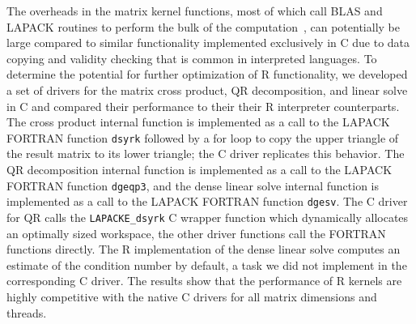 The overheads in the matrix kernel functions, most of which call BLAS and
  LAPACK routines to perform the bulk of the computation~\cite{cran:Rmanuals},
  can potentially be large compared to similar functionality implemented
  exclusively in C due to data copying and validity checking that is common in
  interpreted languages.
To determine the potential for further optimization of R functionality, we
  developed a set of drivers for the matrix cross product, QR decomposition,
  and linear solve in C and compared their performance to their
  their R interpreter counterparts.
The cross product internal function is implemented as a call to the LAPACK
  FORTRAN function \texttt{dsyrk} followed by a for loop to copy the upper
  triangle of the result matrix to its lower triangle; the C driver replicates
  this behavior.
The QR decomposition internal function is implemented as a call to the LAPACK
  FORTRAN function \texttt{dgeqp3}, and the dense linear solve internal function
  is implemented as a call to the LAPACK FORTRAN function \texttt{dgesv}.
The C driver for QR calls the \texttt{LAPACKE\_dsyrk} C wrapper function which
  dynamically allocates an optimally sized workspace, the other driver functions
  call the FORTRAN functions directly.
The R implementation of the dense linear solve computes an estimate of the
  condition number by default, a task we did not implement in the corresponding
  C driver.
The results show that the performance of R kernels are highly competitive with
  the native C drivers for all matrix dimensions and threads.

